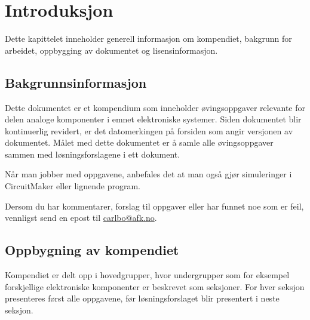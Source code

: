 \chapter{Introduksjon}
\label{ch:introduksjon}
Dette kapittelet inneholder generell informasjon om kompendiet, bakgrunn for arbeidet, oppbygging av dokumentet og lisensinformasjon.

\section{Bakgrunnsinformasjon}
Dette dokumentet er et kompendium som inneholder øvingsoppgaver relevante for delen analoge komponenter i emnet elektroniske systemer. Siden dokumentet blir kontinuerlig revidert, er det datomerkingen på forsiden som angir versjonen av dokumentet. Målet med dette dokumentet er å samle alle øvingsoppgaver sammen med løsningsforslagene i ett dokument.

Når man jobber med oppgavene, anbefales det at man også gjør simuleringer i CircuitMaker eller lignende program. %

Dersom du har kommentarer, forslag til oppgaver eller har funnet noe som er feil, vennligst send en epost til \href{mailto:carlbo@afk.no}{carlbo@afk.no}.

\section{Oppbygning av kompendiet}
Kompendiet er delt opp i hovedgrupper, hvor undergrupper som for eksempel forskjellige elektroniske komponenter er beskrevet som seksjoner. For hver seksjon presenteres først alle oppgavene, før løsningsforslaget blir presentert i neste seksjon.

\begin{comment}
	\section{Lisensinformasjon}
	Dette dokumentet er basert på materiale fra \textit{Lessons In Electric Circuits} av Tony R. Kuphaldt, distribuert under Design Science License. Originaldokumentet kan finnes på \href{https://www.ibiblio.org/kuphaldt/electricCircuits/}{Lessons In Electric Circuits}. Eventuelle modifikasjoner og avledede verk er også distribuert under Design Science License.
	
	Deler av dette kompendiet er utviklet av Carl Magnus Bøe. Disse delene inkluderer:
	\begin{enumerate}[label=\roman*)]
		\item Kapittel \ref{sec:diodeOppgave} / \ref{sec:diodeLøsning}
		\item 
	\end{enumerate}
\end{comment}